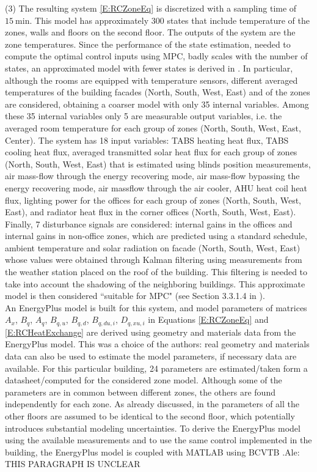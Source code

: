 \textcolor[rgb]{0,0,1}{(3) The resulting system \eqref{E:RCZoneEq} is discretized with a sampling time of $15\ \mathrm{min}$. This model has approximately 300 states that include temperature of the zones, walls and floors on the second floor. The outputs of the system are the zone temperatures. Since the performance of the state estimation, needed to compute the optimal control inputs using MPC, badly scales with the number of states, an approximated model with fewer states is derived in \cite{SturzeneggerTR}. In particular, although the rooms are equipped with temperature sensors, different averaged temperatures of the building facades (North, South, West, East) and of the zones are considered, obtaining a coarser model with only 35 internal variables. Among these 35 internal variables only 5 are measurable output variables, i.e. the averaged room temperature for each group of zones (North, South, West, East, Center). The system has 18 input variables: TABS heating heat flux, TABS cooling heat flux, averaged transmitted solar heat flux for each group of zones (North, South, West, East) that is estimated using blinds position measurements, air mass-flow through the energy recovering mode, air mass-flow bypassing the energy recovering mode, air massflow through the air cooler, AHU heat coil heat flux, lighting power for the offices for each group of zones (North, South, West, East), and radiator heat flux in the corner offices (North, South, West, East). Finally, 7 disturbance signals are considered: internal gains in the offices and internal gains in non-office zones, which are predicted using a standard schedule, ambient temperature and solar radiation on facade (North, South, West, East) whose values were obtained through Kalman filtering using measurements from the weather station placed on the roof of the building. This filtering is needed to take into account the shadowing of the neighboring buildings. This approximate model is then considered ``suitable for MPC" (see Section 3.3.1.4 in \cite{SturzeneggerTR}).\\
An EnergyPlus model is built for this system, and model parameters of matrices $A_x$, $B_q$, $A_q$, $B_{q,u}$, $B_{q,d}$, $B_{q,du,i}$, $D_{q,xu,i}$ in Equations \eqref{E:RCZoneEq} and \eqref{E:RCHeatExchange} are derived using geometry and materials data from the EnergyPlus model. This was a choice of the authors: real geometry and materials data can also be used to estimate the model parameters, if necessary data are available. For this particular building, 24 parameters are estimated/taken form a datasheet/computed for the considered zone model. Although some of the parameters are in common between different zones, the others are found independently for each zone. As already discussed, in \cite{SturzeneggerTR} the parameters of all the other floors are assumed to be identical to the second floor, which potentially introduces substantial modeling uncertainties. To derive the EnergyPlus model using the available measurements and to use the same control implemented in the building, the EnergyPlus model is coupled with MATLAB using BCVTB \cite{Wetter2015}.\textcolor[rgb]{1,0,0}{Ale: THIS PARAGRAPH IS UNCLEAR}\\
}
